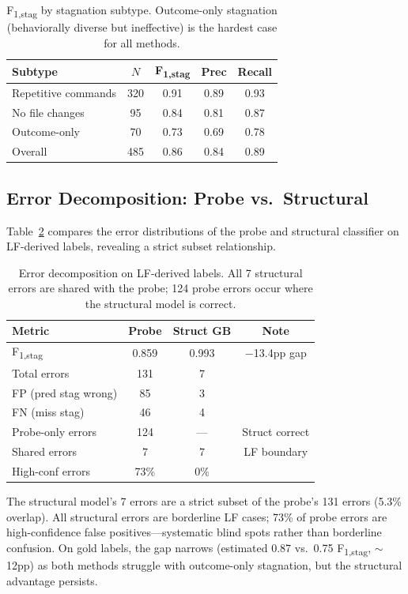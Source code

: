 \documentclass[11pt,a4paper]{article}
\newcommand{\fstagone}{F\textsubscript{1,stag}}
\begin{document}
\begin{table}[t]
\centering
\small
\begin{tabular}{lcccc}
\toprule
Subtype & $N$ & \fstagone{} & Prec & Recall \\
\midrule
Repetitive commands & 320 & 0.91 & 0.89 & 0.93 \\
No file changes & 95 & 0.84 & 0.81 & 0.87 \\
Outcome-only & 70 & 0.73 & 0.69 & 0.78 \\
\midrule
Overall & 485 & 0.86 & 0.84 & 0.89 \\
\bottomrule
\end{tabular}
\caption{\fstagone{} by stagnation subtype. Outcome-only stagnation (behaviorally diverse but ineffective) is the hardest case for all methods.}
\label{tab:fstag-subtype}
\end{table}


\subsection{Error Decomposition: Probe vs.\ Structural}
\label{sec:error-decomp}

Table~\ref{tab:error-decomp} compares the error distributions of the probe and structural classifier on LF-derived labels, revealing a strict subset relationship.

\begin{table}[t]
\centering
\small
\begin{tabular}{lccc}
\toprule
Metric & Probe & Struct GB & Note \\
\midrule
\fstagone{} & 0.859 & 0.993 & $-$13.4pp gap \\
Total errors & 131 & 7 & \\
FP (pred stag wrong) & 85 & 3 & \\
FN (miss stag) & 46 & 4 & \\
Probe-only errors & 124 & --- & Struct correct \\
Shared errors & 7 & 7 & LF boundary \\
High-conf errors & 73\% & 0\% & \\
\bottomrule
\end{tabular}
\caption{Error decomposition on LF-derived labels. All 7 structural errors are shared with the probe; 124 probe errors occur where the structural model is correct.}
\label{tab:error-decomp}
\end{table}

The structural model's 7 errors are a strict subset of the probe's 131 errors (5.3\% overlap). All structural errors are borderline LF cases; 73\% of probe errors are high-confidence false positives---systematic blind spots rather than borderline confusion. On gold labels, the gap narrows (estimated 0.87 vs.\ 0.75 \fstagone{}, $\sim$12pp) as both methods struggle with outcome-only stagnation, but the structural advantage persists.
\end{document}
